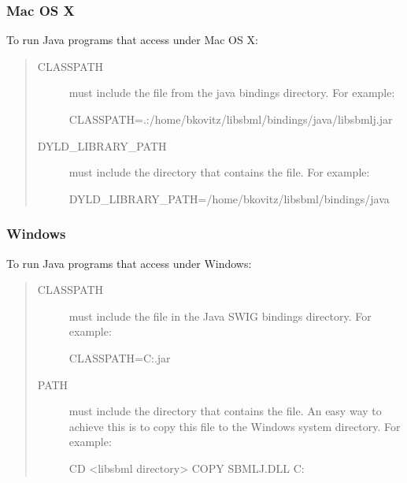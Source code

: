 \documentclass{sbmlmanual}
\begin{document}
\subsubsection{Mac OS X}
\label{sec:java-osx-setup}

To run Java programs that access \libsbml{} under Mac OS X:

\begin{quote}
\begin{description}

\item[CLASSPATH]
must include the  file from the \libsbml{}
java bindings directory.  For example:

\begin{shellVerbatim}
CLASSPATH=.:/home/bkovitz/libsbml/bindings/java/libsbmlj.jar
\end{shellVerbatim}

\item[DYLD\_LIBRARY\_PATH]
must include the directory that contains the
 file.  For example:

\begin{shellVerbatim}
DYLD_LIBRARY_PATH=/home/bkovitz/libsbml/bindings/java
\end{shellVerbatim}

\end{description}
\end{quote}

\subsubsection{Windows}
\label{sec:java-windows-setup}

To run Java programs that access \libsbml{} under Windows:

\begin{quote}
\begin{description}

\item[CLASSPATH]
must include the  file in the Java SWIG
bindings directory.  For example:

\begin{shellVerbatim}
CLASSPATH=C:\libsbml\bindings\java\sbmlj.jar
\end{shellVerbatim}

\item[PATH]
must include the directory that contains the  file. An
easy way to achieve this is to copy this file to the Windows system
directory. For example:

\begin{shellVerbatim}
CD <libsbml directory>
COPY SBMLJ.DLL C:\WINDOWS{}
\end{shellVerbatim}

\end{description}
\end{quote}
\end{document}
